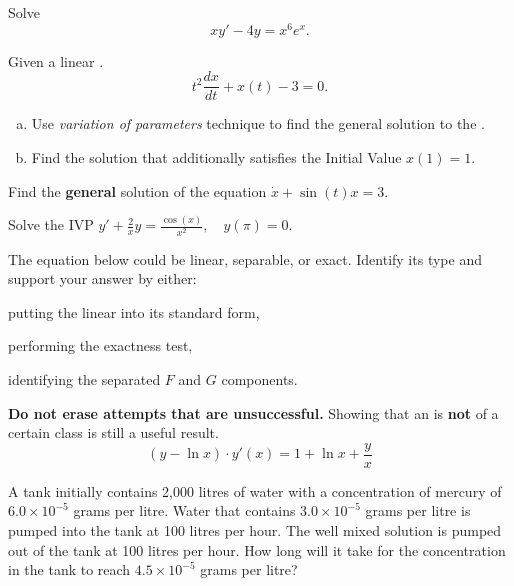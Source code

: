 \begin{question}
    Solve
    \[
    xy' - 4y =x^6e^x.
    \]
\end{question}



\begin{question}
  Given a linear \ode{}.
  \begin{equation}\label{eq:wk3-1}
    t^{2} \frac{dx}{dt}  + x(t) - 3 = 0.
  \end{equation}
  
  \begin{enumerate}[(a)]
      \item Use \emph{variation of parameters} technique to find the general
        solution to the \ode{}. 
        \solspace{0.5in}
      \item Find the solution that additionally satisfies the Initial Value \(x(1) = 1\).
        \solspace{0.5in}
  \end{enumerate}
\end{question}

\begin{question}
  Find the \textbf{general} solution of the equation  \(\dot x + \sin(t) x =3\).
\solspace{0.5in}
\end{question}

\begin{question}
  Solve the IVP \(y' + \frac{2}{x}y = \frac{\cos(x)}{x^2}, \quad y(\pi) = 0.\)
\end{question}

\begin{question}
The equation below could be linear, separable, or exact. Identify its type and support your answer by either:
  \begin{compactitem}
  \item putting the linear  into its standard form,
  \item performing the exactness test,
    \item identifying the separated \(F\) and \(G\) components.
    \end{compactitem}
    \textbf{Do not erase attempts that are unsuccessful.} Showing that an \ode{} is \textbf{not} of a certain class is still a useful result.
    \[(y-\ln x)\cdot y'(x) = 1 + \ln x + \frac{y}{x}\]
    \solspace{0.5in}
  \end{question}


\begin{question}
 A tank initially contains 2,000 litres of water with a concentration of mercury of $6.0\times10^{-5}$ grams
per litre. Water that contains $3.0\times 10^{-5}$ grams per litre is pumped into the tank at 100 litres per
hour. The well mixed solution is pumped out of the tank at 100 litres per hour. How long will it
take for the concentration in the tank to reach $4.5\times 10^{-5}$ grams per litre?
\solspace{0.5in}
\end{question}

